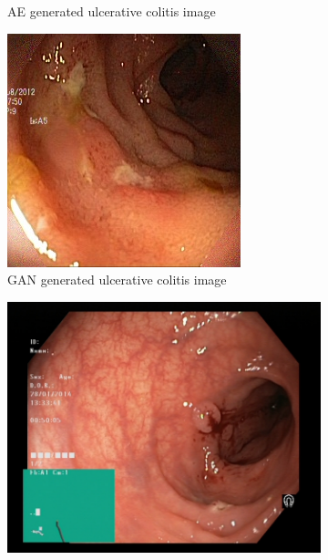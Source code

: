 \begin{figure}
\begin{subfigure}[t]{\myfigsizethree}
            \caption{ AE generated ulcerative colitis image }    
            \label{fig:polyp_AE_CORNER2}
        \end{subfigure}
        \qquad
        \begin{subfigure}[t]{\myfigsizethree}  
            \centering 
            \includegraphics[width=\textwidth]{experiments/figures/blackcorner/ucGAN.jpg}
            \caption{ GAN generated ulcerative colitis image}   
            \label{fig:polyp_GAN_CORNER2}
        \end{subfigure}
        \qquad\vfill%
        \begin{subfigure}[t]{\myfigsizethree}   
            \centering 
            \includegraphics[height=\textwidth, width=\textwidth]{experiments/figures/blackcorner/polypwithgreenORIG.jpg}

\end{subfigure}
\end{figure}
